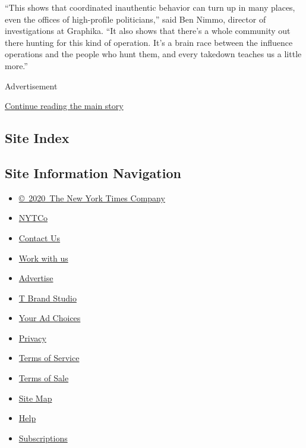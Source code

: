 ``This shows that coordinated inauthentic behavior can turn up in many
places, even the offices of high-profile politicians,'' said Ben Nimmo,
director of investigations at Graphika. ``It also shows that there's a
whole community out there hunting for this kind of operation. It's a
brain race between the influence operations and the people who hunt
them, and every takedown teaches us a little more.''

Advertisement

\protect\hyperlink{after-bottom}{Continue reading the main story}

\hypertarget{site-index}{%
\subsection{Site Index}\label{site-index}}

\hypertarget{site-information-navigation}{%
\subsection{Site Information
Navigation}\label{site-information-navigation}}

\begin{itemize}
\tightlist
\item
  \href{https://help.nytimes3xbfgragh.onion/hc/en-us/articles/115014792127-Copyright-notice}{©~2020~The
  New York Times Company}
\end{itemize}

\begin{itemize}
\tightlist
\item
  \href{https://www.nytco.com/}{NYTCo}
\item
  \href{https://help.nytimes3xbfgragh.onion/hc/en-us/articles/115015385887-Contact-Us}{Contact
  Us}
\item
  \href{https://www.nytco.com/careers/}{Work with us}
\item
  \href{https://nytmediakit.com/}{Advertise}
\item
  \href{http://www.tbrandstudio.com/}{T Brand Studio}
\item
  \href{https://www.nytimes3xbfgragh.onion/privacy/cookie-policy\#how-do-i-manage-trackers}{Your
  Ad Choices}
\item
  \href{https://www.nytimes3xbfgragh.onion/privacy}{Privacy}
\item
  \href{https://help.nytimes3xbfgragh.onion/hc/en-us/articles/115014893428-Terms-of-service}{Terms
  of Service}
\item
  \href{https://help.nytimes3xbfgragh.onion/hc/en-us/articles/115014893968-Terms-of-sale}{Terms
  of Sale}
\item
  \href{https://spiderbites.nytimes3xbfgragh.onion}{Site Map}
\item
  \href{https://help.nytimes3xbfgragh.onion/hc/en-us}{Help}
\item
  \href{https://www.nytimes3xbfgragh.onion/subscription?campaignId=37WXW}{Subscriptions}
\end{itemize}
